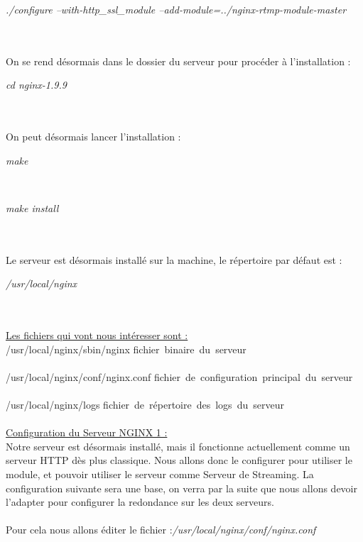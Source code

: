 \documentclass{report}
\begin{document}
    \begin{center}
    \textit{./configure --with-http\_ssl\_module --add-module=../nginx-rtmp-module-master}
    \end{center}
    \\
    \\
    On se rend désormais dans le dossier du serveur pour procéder à l’installation :


    \begin{center}
    \textit{cd nginx-1.9.9}
    \end{center}
    \\
    \\
    On peut désormais lancer l’installation :


    \begin{center}
    \textit{make}
    \end{center}
    \\
     \begin{center}
    \textit{make install}
    \end{center}
    \\
    \\
    Le serveur est désormais installé sur la machine, le répertoire par défaut est : 


    \begin{center}
    \textit{/usr/local/nginx}
    \end{center}
    \\
    \\
    
    \underline{Les fichiers qui vont nous intéresser sont : }\\

     
    /usr/local/nginx/sbin/nginx    \rightarrow    fichier~binaire~du~serveur
     \\
     \\
     
    /usr/local/nginx/conf/nginx.conf    \rightarrow  fichier~de~configuration~principal~du~serveur
    \\
    \\
    
    /usr/local/nginx/logs    \rightarrow fichier~de~répertoire~des~logs~du~serveur
    \\
    \\
    
    \underline{Configuration du Serveur NGINX 1 :}\\
    
    Notre serveur est désormais installé, mais il fonctionne actuellement comme un serveur HTTP dès plus classique. Nous allons donc le configurer pour utiliser le module, et pouvoir utiliser le serveur comme Serveur de Streaming. La configuration suivante sera une base, on verra par la suite que nous allons devoir l’adapter pour configurer la redondance sur les deux serveurs.
    \\
    \\
    Pour cela nous allons éditer le fichier :\textit{/usr/local/nginx/conf/nginx.conf}
    \\
    \\
    
\end{document}
